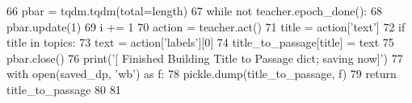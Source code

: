 \begin{DoxyCode}
66     pbar = tqdm.tqdm(total=length)
67     \textcolor{keywordflow}{while} \textcolor{keywordflow}{not} teacher.epoch\_done():
68         pbar.update(1)
69         i += 1
70         action = teacher.act()
71         title = action[\textcolor{stringliteral}{'text'}]
72         \textcolor{keywordflow}{if} title \textcolor{keywordflow}{in} topics:
73             text = action[\textcolor{stringliteral}{'labels'}][0]
74             title\_to\_passage[title] = text
75     pbar.close()
76     print(\textcolor{stringliteral}{'[ Finished Building Title to Passage dict; saving now]'})
77     with open(saved\_dp, \textcolor{stringliteral}{'wb'}) \textcolor{keyword}{as} f:
78         pickle.dump(title\_to\_passage, f)
79     \textcolor{keywordflow}{return} title\_to\_passage
80 
81 
\end{DoxyCode}
